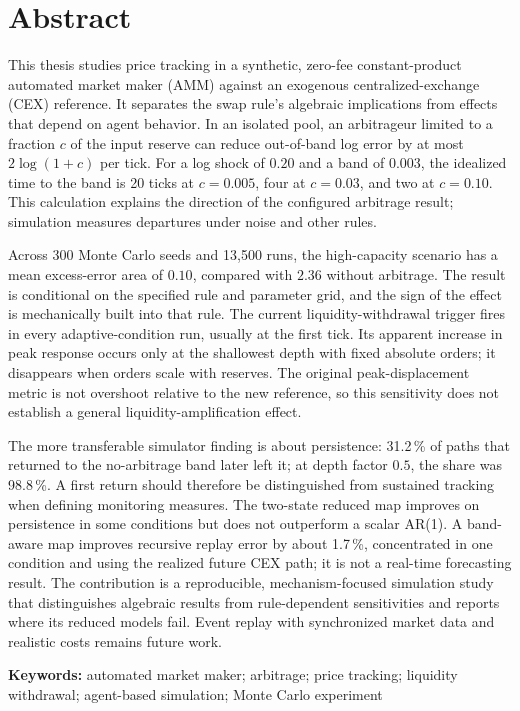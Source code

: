 \section{Abstract}

This thesis studies price tracking in a synthetic, zero-fee constant-product automated market maker (AMM) against an exogenous centralized-exchange (CEX) reference. It separates the swap rule's algebraic implications from effects that depend on agent behavior. In an isolated pool, an arbitrageur limited to a fraction $c$ of the input reserve can reduce out-of-band log error by at most $2\log(1+c)$ per tick. For a log shock of $0.20$ and a band of $0.003$, the idealized time to the band is 20 ticks at $c=0.005$, four at $c=0.03$, and two at $c=0.10$. This calculation explains the direction of the configured arbitrage result; simulation measures departures under noise and other rules.

Across 300 Monte Carlo seeds and 13,500 runs, the high-capacity scenario has a mean excess-error area of $0.10$, compared with $2.36$ without arbitrage. The result is conditional on the specified rule and parameter grid, and the sign of the effect is mechanically built into that rule. The current liquidity-withdrawal trigger fires in every adaptive-condition run, usually at the first tick. Its apparent increase in peak response occurs only at the shallowest depth with fixed absolute orders; it disappears when orders scale with reserves. The original peak-displacement metric is not overshoot relative to the new reference, so this sensitivity does not establish a general liquidity-amplification effect.

The more transferable simulator finding is about persistence: 31.2\,\% of paths that returned to the no-arbitrage band later left it; at depth factor $0.5$, the share was 98.8\,\%. A first return should therefore be distinguished from sustained tracking when defining monitoring measures. The two-state reduced map improves on persistence in some conditions but does not outperform a scalar AR(1). A band-aware map improves recursive replay error by about 1.7\,\%, concentrated in one condition and using the realized future CEX path; it is not a real-time forecasting result. The contribution is a reproducible, mechanism-focused simulation study that distinguishes algebraic results from rule-dependent sensitivities and reports where its reduced models fail. Event replay with synchronized market data and realistic costs remains future work.

\textbf{Keywords:} automated market maker; arbitrage; price tracking; liquidity withdrawal; agent-based simulation; Monte Carlo experiment
